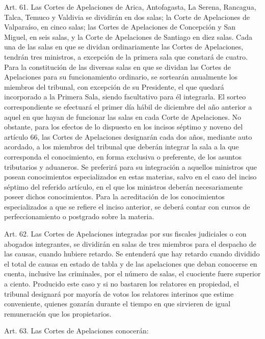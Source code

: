     Art. 61. Las Cortes de Apelaciones de Arica, Antofagasta, La Serena, Rancagua, Talca, Temuco y Valdivia se dividirán en dos salas; la Corte de Apelaciones de Valparaíso, en cinco salas; las Cortes de Apelaciones de Concepción y San Miguel, en seis salas, y la Corte de Apelaciones de Santiago en diez salas. Cada una de las salas en que se dividan ordinariamente las Cortes de Apelaciones, tendrán tres ministros, a excepción de la primera sala que constará de cuatro. Para la constitución de las diversas salas en que se dividan las Cortes de Apelaciones para su funcionamiento ordinario, se sortearán anualmente los miembros del tribunal, con excepción de su Presidente, el que quedará incorporado a la Primera Sala, siendo facultativo para él integrarla. El sorteo correspondiente se efectuará el primer día hábil de diciembre del año anterior a aquel en que hayan de funcionar las salas en cada Corte de Apelaciones.
    No obstante, para los efectos de lo dispuesto en los incisos séptimo y noveno del artículo 66, las Cortes de Apelaciones designarán cada dos años, mediante auto acordado, a los miembros del tribunal que deberán integrar la sala a la que corresponda el conocimiento, en forma exclusiva o preferente, de los asuntos tributarios y aduaneros. Se preferirá para su integración a aquellos ministros que posean conocimientos especializados en estas materias, salvo en el caso del inciso séptimo del referido artículo, en el que los ministros deberán necesariamente poseer dichos conocimientos.
    Para la acreditación de los conocimientos especializados a que se refiere el inciso anterior, se deberá contar con cursos de perfeccionamiento o postgrado sobre la materia.



    Art. 62. Las Cortes de Apelaciones integradas por sus fiscales judiciales o con abogados integrantes, se dividirán en salas de tres miembros para el despacho de las causas, cuando hubiere retardo.
    Se entenderá que hay retardo cuando dividido el total de causas en estado de tabla y de las apelaciones que deban conocerse en cuenta, inclusive las criminales, por el número de salas, el cuociente fuere superior a ciento.
    Producido este caso y si no bastaren los relatores en propiedad, el tribunal designará por mayoría de votos los relatores interinos que estime conveniente, quienes gozarán durante el tiempo en que sirvieren de igual remuneración que los propietarios.



    Art. 63. Las Cortes de Apelaciones conocerán:

